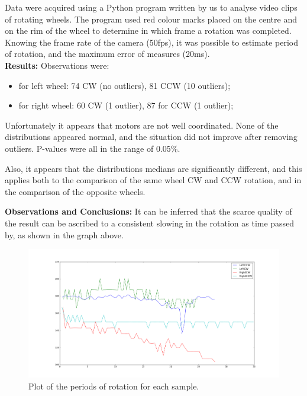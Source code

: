 \documentclass[a4paper,twoside]{book}
\begin{document}
Data were acquired using a Python program written by us to analyse video clips of rotating wheels. The program used red colour marks placed on the centre and on the rim of the wheel to determine in which frame a rotation was completed. Knowing the frame rate of the camera (50fps), it was possible to estimate period of rotation, and the maximum error of measures (20ms).
\\

\textbf{Results:}
Observations were:
\begin{itemize}
\item for left wheel: 74 CW (no outliers), 81 CCW (10 outliers);
\item for right wheel: 60 CW (1 outlier), 87 for CCW (1 outlier);
\end{itemize}

Unfortunately it appears that motors are not well coordinated. None of the distributions appeared normal, and the situation did not improve after removing outliers. P-values were all in the range of 0.05\%.

Also, it appears that the distributions medians are significantly different, and this applies both to the comparison of the same wheel CW and CCW rotation, and in the comparison of the opposite wheels.

\textbf{Observations and Conclusions:} 
It can be inferred that the scarce quality of the result can be ascribed to a consistent slowing in the rotation as time passed by, as shown in the graph above. 


\begin{figure}[h]
\includegraphics[width=\paperwidth, center]{img/figure_1}
\caption{Plot of the periods of rotation for each sample.}
\end{figure}
\end{document}
